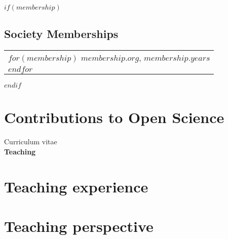 \documentclass[martgin, line, 11pt]{article}
\begin{document}
$if(membership)$
\subsection*{Society Memberships}
\begin{tabular}{l}
$for(membership)$
 $membership.org$, $membership.years$\\
$endfor$
\end{tabular}
$endif$

\section*{Contributions to Open Science} 


\newpage
\begin{flushright}
  {\large Curriculum vitae}\\
  {\large \textbf{Teaching}}
\end{flushright}

\section*{Teaching experience}


\section*{Teaching perspective}

\end{document}
